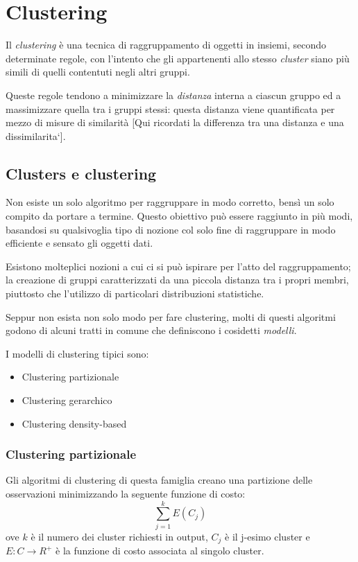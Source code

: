 \chapter{Clustering}

Il \emph{clustering} è una tecnica di raggruppamento di oggetti in insiemi, secondo determinate regole, con l'intento che gli appartenenti allo stesso \emph{cluster} siano più simili di quelli contentuti negli altri gruppi.

Queste regole tendono a minimizzare la \emph{distanza} interna a ciascun gruppo ed a massimizzare quella tra i gruppi stessi: questa distanza viene quantificata per mezzo di misure di similarità [Qui ricordati la differenza tra una distanza e una dissimilarita`].

\section{Clusters e clustering}

Non esiste un solo algoritmo per raggruppare in modo corretto, bensì un solo compito da portare a termine. Questo obiettivo può essere raggiunto in più modi, basandosi su qualsivoglia tipo di nozione col solo fine di raggruppare in modo efficiente e sensato gli oggetti dati. 

Esistono molteplici nozioni a cui ci si può ispirare per l'atto del raggruppamento; la creazione di gruppi caratterizzati da una piccola distanza tra i propri membri, piuttosto che l'utilizzo di particolari distribuzioni statistiche.

Seppur non esista non solo modo per fare clustering, molti di questi algoritmi godono di alcuni tratti in comune che definiscono i cosidetti \emph{modelli}.

I modelli di clustering tipici sono:
\begin{itemize}
	\item Clustering partizionale 
	\item Clustering gerarchico 
	\item Clustering density-based 
\end{itemize}

\subsection{Clustering partizionale}
	
	Gli algoritmi di clustering di questa famiglia creano una partizione delle osservazioni minimizzando la seguente funzione di costo:
	\begin{equation*}
	  \sum_{j=1}^{k}E(C_j)
	\end{equation*}
	ove $k$ è il numero dei cluster richiesti in output, $C_j$ è il j-esimo cluster e $E:C \rightarrow R^{+}$ è la funzione di costo associata al singolo cluster.

